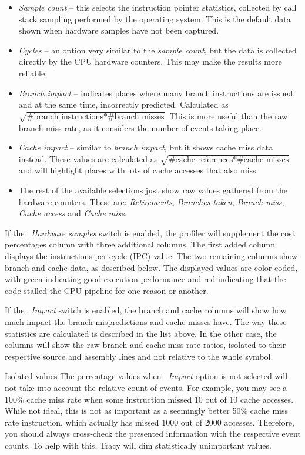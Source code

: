 \documentclass[hidelinks,titlepage,a4paper]{article}
\begin{document}
\begin{itemize}
\item \emph{Sample count} -- this selects the instruction pointer statistics, collected by call stack sampling performed by the operating system. This is the default data shown when hardware samples have not been captured.
\item \emph{Cycles} -- an option very similar to the \emph{sample count}, but the data is collected directly by the CPU hardware counters. This may make the results more reliable.
\item \emph{Branch impact} -- indicates places where many branch instructions are issued, and at the same time, incorrectly predicted. Calculated as $\sqrt{\text{\#branch instructions}*\text{\#branch misses}}$. This is more useful than the raw branch miss rate, as it considers the number of events taking place.
\item \emph{Cache impact} -- similar to \emph{branch impact}, but it shows cache miss data instead. These values are calculated as $\sqrt{\text{\#cache references}*\text{\#cache misses}}$ and will highlight places with lots of cache accesses that also miss.
\item The rest of the available selections just show raw values gathered from the hardware counters. These are: \emph{Retirements}, \emph{Branches taken}, \emph{Branch miss}, \emph{Cache access} and \emph{Cache miss}.
\end{itemize}

If the \emph{\faHammer{}~Hardware samples} switch is enabled, the profiler will supplement the cost percentages column with three additional columns. The first added column displays the instructions per cycle (IPC) value. The two remaining columns show branch and cache data, as described below. The displayed values are color-coded, with green indicating good execution performance and red indicating that the code stalled the CPU pipeline for one reason or another.

If the \emph{\faCarCrash{}~Impact} switch is enabled, the branch and cache columns will show how much impact the branch mispredictions and cache misses have. The way these statistics are calculated is described in the list above. In the other case, the columns will show the raw branch and cache miss rate ratios, isolated to their respective source and assembly lines and not relative to the whole symbol.

\begin{bclogo}[
noborder=true,
couleur=black!5,
logo=\bcattention
]{Isolated values}
The percentage values when \emph{\faCarCrash{}~Impact} option is not selected will not take into account the relative count of events. For example, you may see a 100\% cache miss rate when some instruction missed 10 out of 10 cache accesses. While not ideal, this is not as important as a seemingly better 50\% cache miss rate instruction, which actually has missed 1000 out of 2000 accesses. Therefore, you should always cross-check the presented information with the respective event counts. To help with this, Tracy will dim statistically unimportant values.
\end{bclogo}
\end{document}
